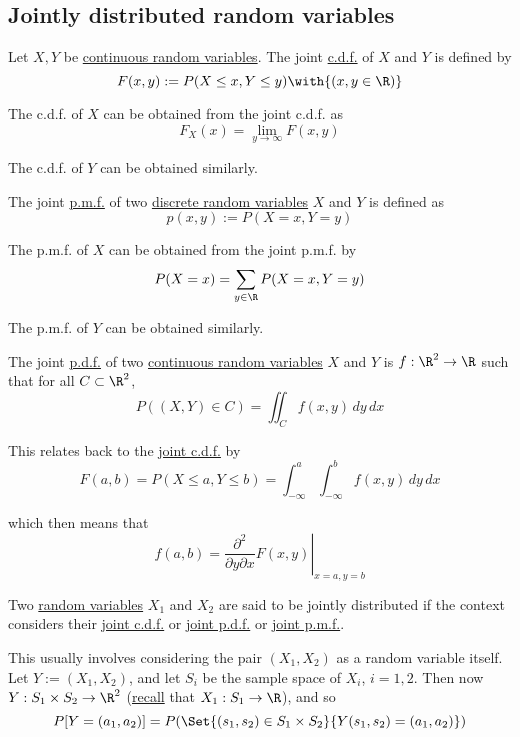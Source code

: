 \subsection{Jointly distributed random variables}\label{a7bb0ce}

\label{ac796f3}

Let $X,Y$ be \href{bdb1e15}{continuous random variables}. The joint
\href{ad1290d}{c.d.f.} of $X$ and $Y$ is defined by
$$
  F(x,y):=P(X\leq x,Y\leq y)\with{(x,y\in\R)}
$$

The c.d.f. of $X$ can be obtained from the joint c.d.f. as
$$
  F_X(x)=\lim_{y\to\infty}F(x,y)
$$

The c.d.f. of $Y$ can be obtained similarly.

\label{e00d4ea}

The joint \href{bcef5f1}{p.m.f.} of two \href{f831030}{discrete random
variables} $X$ and $Y$ is defined as
$$
  p(x,y):=P(X=x,Y=y)
$$

The p.m.f. of $X$ can be obtained from the joint p.m.f. by
$$
  P(X=x)=\sum_{y\in\R}P(X=x,Y=y)
$$

The p.m.f. of $Y$ can be obtained similarly.

\label{b62ce9b}

The joint \href{cb9d3f0}{p.d.f.} of two \href{bdb1e15}{continuous random
variables} $X$ and $Y$ is $f:\R^2\to\R$ such that for all $C\subset\R^2$,
$$
  P((X,Y)\in C)=\iint_Cf(x,y)\,dy\,dx
$$

This relates back to the \href{ac796f3}{joint c.d.f.} by
$$
  F(a,b)=P(X\leq a,Y\leq b)=\int_{-\infty}^a\int_{-\infty}^bf(x,y)\,dy\,dx
$$

which then means that
$$
  f(a,b)=\left.\frac{\partial^2}{\partial y\partial x}F(x,y)\right|_{x=a,y=b}
$$

\label{ab5a852}

Two \href{b96960b}{random variables} $X_1$ and $X_2$ are said to be jointly
distributed if the context considers their \href{ac796f3}{joint c.d.f.} or
\href{b62ce9b}{joint p.d.f.} or \href{e00d4ea}{joint p.m.f.}.

This usually involves considering the pair $(X_1,X_2)$ as a random variable
itself. Let $Y:=(X_1,X_2)$, and let $S_i$ be the sample space of $X_i$,
$i=1,2$. Then now $Y:S_1\times S_2\to\R^2$ (\href{b96960b}{recall} that
$X_1:S_1\to\R$), and so
$$
  P[Y=(a_1,a_2)]=P(\Set{(s_1,s_2)\in S_1\times S_2}{Y(s_1,s_2)=(a_1,a_2)})
$$

